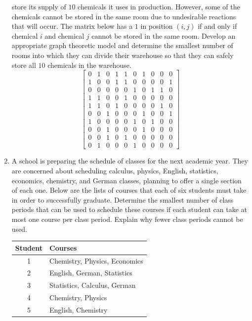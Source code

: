 \begin{enumerate}
  store its supply of $10$ chemicals it uses in production. However,
  some of the chemicals cannot be stored in the same room due to undesirable
  reactions that will occur. The matrix below has a $1$ in position
  $(i,j)$ if and only if chemical $i$ and chemical $j$ cannot be
  stored in the same room. Develop an appropriate graph theoretic
  model and determine the smallest number of rooms into which they can
  divide their warehouse so that they can safely store all $10$
  chemicals in the warehouse.
  \[
  \begin{bmatrix}
    0 & 1 & 0 & 1 & 1 & 0 & 1 & 0 & 0 & 0\\
    1 & 0 & 0 & 1 & 1 & 0 & 0 & 0 & 0 & 1\\
    0 & 0 & 0 & 0 & 0 & 1 & 0 & 1 & 1 & 0\\
    1 & 1 & 0 & 0 & 1 & 0 & 0 & 0 & 0 & 0\\
    1 & 1 & 0 & 1 & 0 & 0 & 0 & 0 & 1 & 0\\
    0 & 0 & 1 & 0 & 0 & 0 & 1 & 0 & 0 & 1\\
    1 & 0 & 0 & 0 & 0 & 1 & 0 & 1 & 0 & 0\\
    0 & 0 & 1 & 0 & 0 & 0 & 1 & 0 & 0 & 0\\
    0 & 0 & 1 & 0 & 1 & 0 & 0 & 0 & 0 & 0\\
    0 & 1 & 0 & 0 & 0 & 1 & 0 & 0 & 0 & 0
  \end{bmatrix}
  \]
\item A school is preparing the schedule of classes for the next
  academic year. They are concerned about scheduling calculus,
  physics, English, statistics, economics, chemistry, and German
  classes, planning to offer a single section of each one. Below are
  the lists of courses that each of six students must take in order to
  successfully graduate. Determine the smallest number of class
  periods that can be used to schedule these courses if each student
  can take at most one course per class period. Explain why fewer
  class periods cannot be used.
  \begin{center}
    \begin{tabular}{c|l}
      Student & Courses\\\hline
      1 & Chemistry, Physics, Economics\\
      2 & English, German, Statistics\\
      3 & Statistics, Calculus, German\\
      4 & Chemistry, Physics\\
      5 & English, Chemistry\\

\end{tabular}
\end{center}
\end{enumerate}
